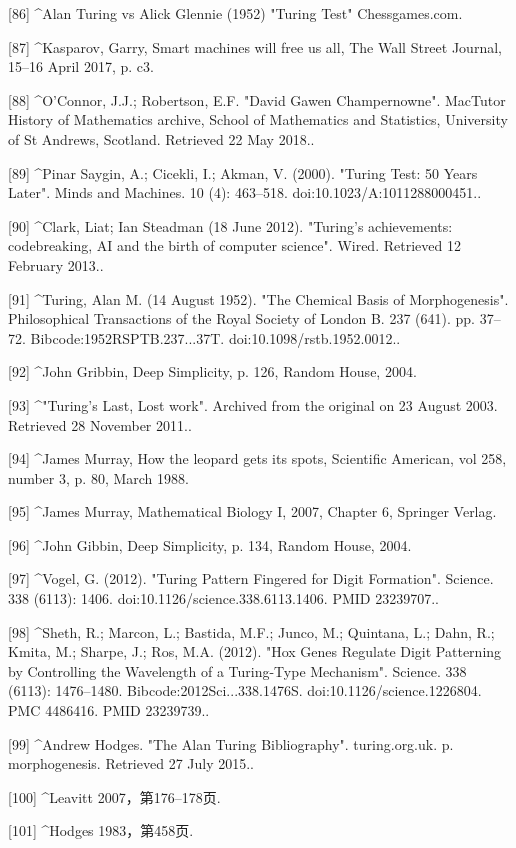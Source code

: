 [86]
^Alan Turing vs Alick Glennie (1952) "Turing Test" Chessgames.com.

[87]
^Kasparov, Garry, Smart machines will free us all, The Wall Street Journal, 15–16 April 2017, p. c3.

[88]
^O'Connor, J.J.; Robertson, E.F. "David Gawen Champernowne". MacTutor History of Mathematics archive, School of Mathematics and Statistics, University of St Andrews, Scotland. Retrieved 22 May 2018..

[89]
^Pinar Saygin, A.; Cicekli, I.; Akman, V. (2000). "Turing Test: 50 Years Later". Minds and Machines. 10 (4): 463–518. doi:10.1023/A:1011288000451..

[90]
^Clark, Liat; Ian Steadman (18 June 2012). "Turing's achievements: codebreaking, AI and the birth of computer science". Wired. Retrieved 12 February 2013..

[91]
^Turing, Alan M. (14 August 1952). "The Chemical Basis of Morphogenesis". Philosophical Transactions of the Royal Society of London B. 237 (641). pp. 37–72. Bibcode:1952RSPTB.237...37T. doi:10.1098/rstb.1952.0012..

[92]
^John Gribbin, Deep Simplicity, p. 126, Random House, 2004.

[93]
^"Turing's Last, Lost work". Archived from the original on 23 August 2003. Retrieved 28 November 2011..

[94]
^James Murray, How the leopard gets its spots, Scientific American, vol 258, number 3, p. 80, March 1988.

[95]
^James Murray, Mathematical Biology I, 2007, Chapter 6, Springer Verlag.

[96]
^John Gibbin, Deep Simplicity, p. 134, Random House, 2004.

[97]
^Vogel, G. (2012). "Turing Pattern Fingered for Digit Formation". Science. 338 (6113): 1406. doi:10.1126/science.338.6113.1406. PMID 23239707..

[98]
^Sheth, R.; Marcon, L.; Bastida, M.F.; Junco, M.; Quintana, L.; Dahn, R.; Kmita, M.; Sharpe, J.; Ros, M.A. (2012). "Hox Genes Regulate Digit Patterning by Controlling the Wavelength of a Turing-Type Mechanism". Science. 338 (6113): 1476–1480. Bibcode:2012Sci...338.1476S. doi:10.1126/science.1226804. PMC 4486416. PMID 23239739..

[99]
^Andrew Hodges. "The Alan Turing Bibliography". turing.org.uk. p. morphogenesis. Retrieved 27 July 2015..

[100]
^Leavitt 2007，第176–178页.

[101]
^Hodges 1983，第458页.

